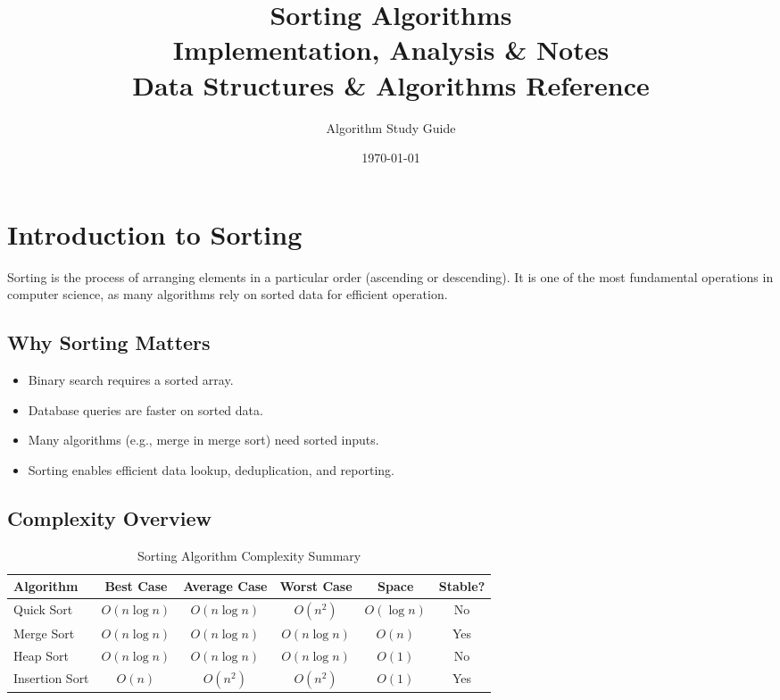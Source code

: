 \documentclass[12pt,a4paper]{article}
\title{
    \Huge \textbf{Sorting Algorithms} \\[0.5em]
    \Large Implementation, Analysis \& Notes \\[0.5em]
    \large Data Structures \& Algorithms Reference
}
\author{Algorithm Study Guide}
\date{\today}
\begin{document}
\maketitle
\tableofcontents
\newpage

\section{Introduction to Sorting}

Sorting is the process of arranging elements in a particular order (ascending or descending). It is one of the most fundamental operations in computer science, as many algorithms rely on sorted data for efficient operation.

\subsection{Why Sorting Matters}
\begin{itemize}
    \item Binary search requires a sorted array.
    \item Database queries are faster on sorted data.
    \item Many algorithms (e.g., merge in merge sort) need sorted inputs.
    \item Sorting enables efficient data lookup, deduplication, and reporting.
\end{itemize}

\subsection{Complexity Overview}

\begin{table}[h!]
\centering
\renewcommand{\arraystretch}{1.4}
\begin{tabular}{|l|c|c|c|c|c|}
\hline
\textbf{Algorithm} & \textbf{Best Case} & \textbf{Average Case} & \textbf{Worst Case} & \textbf{Space} & \textbf{Stable?} \\
\hline
Quick Sort      & $O(n \log n)$ & $O(n \log n)$ & $O(n^2)$      & $O(\log n)$ & No \\
Merge Sort      & $O(n \log n)$ & $O(n \log n)$ & $O(n \log n)$ & $O(n)$      & Yes \\
Heap Sort       & $O(n \log n)$ & $O(n \log n)$ & $O(n \log n)$ & $O(1)$      & No \\
Insertion Sort  & $O(n)$        & $O(n^2)$      & $O(n^2)$      & $O(1)$      & Yes \\
\hline
\end{tabular}
\caption{Sorting Algorithm Complexity Summary}
\end{table}
\end{document}
